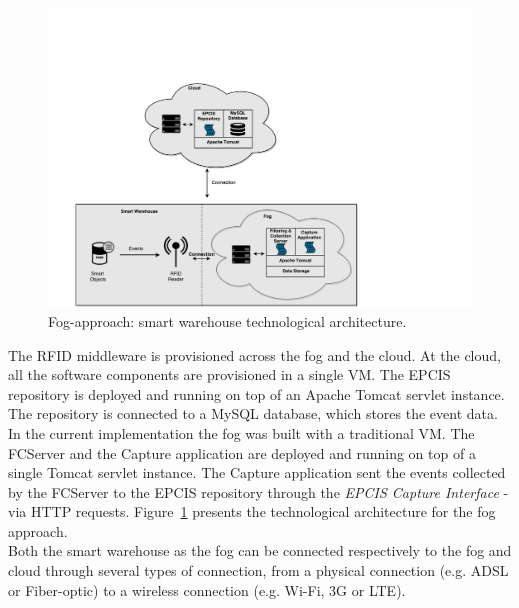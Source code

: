 \begin{figure}
  \centering
  \includegraphics[width=\textwidth]{./images/implementation_fog_architecture}
  \caption[Fog-approach: technological architecture.]{Fog-approach: smart warehouse technological architecture.}
  \label{fig:implementation_fog_architecture}
\end{figure}

The \gls{RFID} middleware is provisioned across the fog and the cloud. At the cloud,
all the software components are provisioned in a single \gls{VM}. The \gls{EPCIS} repository is deployed
and running on top of an Apache Tomcat servlet instance. The repository is connected to a MySQL
database, which stores the event data. In the current implementation the fog was built with a traditional
\gls{VM}. The \gls{FCServer} and the Capture application are deployed and running on top of a single
Tomcat servlet instance. The Capture application sent the events collected by the \gls{FCServer} to
the \gls{EPCIS} repository through the \textit{\gls{EPCIS} Capture Interface} - via \gls{HTTP} requests.
Figure~\ref{fig:implementation_fog_architecture} presents the technological architecture for the fog
approach.\\

Both the smart warehouse as the fog can be connected respectively to the fog and cloud through several
types of connection, from a physical connection (e.g. \gls{ADSL} or Fiber-optic) to a wireless connection
(e.g. Wi-Fi, 3G or \gls{LTE}).

